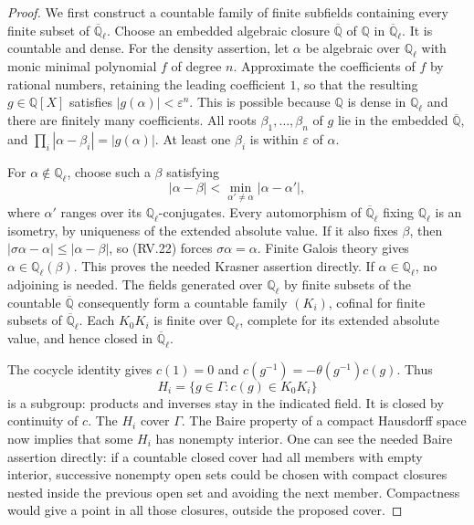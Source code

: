 \begin{proof}
We first construct a countable family of finite subfields
containing every finite subset of $\overline{\mathbb Q}_\ell$.
Choose an embedded algebraic closure $\overline{\mathbb Q}$ of
$\mathbb Q$ in $\overline{\mathbb Q}_\ell$.
It is countable and dense.
For the density assertion, let $\alpha$ be algebraic over
$\mathbb Q_\ell$ with monic minimal polynomial $f$ of degree $n$.
Approximate the coefficients of $f$ by rational numbers, retaining
the leading coefficient $1$, so that the resulting
$g\in\mathbb Q[X]$ satisfies $|g(\alpha)|<\varepsilon^n$.
This is possible because $\mathbb Q$ is dense in $\mathbb Q_\ell$
and there are finitely many coefficients.
All roots $\beta_1,\ldots,\beta_n$ of $g$ lie in the embedded
$\overline{\mathbb Q}$, and
$\prod_i|\alpha-\beta_i|=|g(\alpha)|$.
At least one $\beta_i$ is within $\varepsilon$ of $\alpha$.

For $\alpha\notin\mathbb Q_\ell$, choose such a $\beta$ satisfying
\[
 |\alpha-\beta|<
       \min_{\alpha'\ne\alpha}
                         |\alpha-\alpha'|,
 \tag{RV.22}
\]
where $\alpha'$ ranges over its $\mathbb Q_\ell$-conjugates.
Every automorphism of $\overline{\mathbb Q}_\ell$ fixing
$\mathbb Q_\ell$ is an isometry, by uniqueness of the extended
absolute value.  If it also fixes $\beta$, then
$|\sigma\alpha-\alpha|\le|\alpha-\beta|$, so (RV.22) forces
$\sigma\alpha=\alpha$.
Finite Galois theory gives $\alpha\in\mathbb Q_\ell(\beta)$.
This proves the needed Krasner assertion directly.
If $\alpha\in\mathbb Q_\ell$, no adjoining is needed.
The fields generated over $\mathbb Q_\ell$ by finite subsets of
the countable $\overline{\mathbb Q}$ consequently form a
countable family $(K_i)$, cofinal for finite subsets of
$\overline{\mathbb Q}_\ell$.
Each $K_0K_i$ is finite over $\mathbb Q_\ell$, complete for
its extended absolute value, and hence closed in
$\overline{\mathbb Q}_\ell$.

The cocycle identity gives $c(1)=0$ and
$c(g^{-1})=-\theta(g^{-1})c(g)$.
Thus
\[
                 H_i=\{g\in\Gamma:c(g)\in K_0K_i\}
 \tag{RV.23}
\]
is a subgroup: products and inverses stay in the indicated field.
It is closed by continuity of $c$.
The $H_i$ cover $\Gamma$.
The Baire property of a compact Hausdorff space now implies that
some $H_i$ has nonempty interior.
One can see the needed Baire assertion directly: if a countable
closed cover had all members with empty interior, successive
nonempty open sets could be chosen with compact closures nested
inside the previous open set and avoiding the next member.
Compactness would give a point in all those closures, outside
the proposed cover.


\end{proof}
